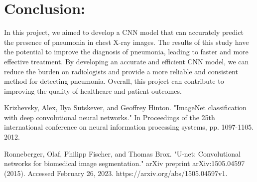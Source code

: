 \documentclass[11pt,a4paper]{article}
\begin{document}
\section*{Conclusion: }\noindent  In this project, we aimed to develop a CNN model that can accurately predict the presence of pneumonia in chest X-ray images. The results of this study have the potential to improve the diagnosis of pneumonia, leading to faster and more effective treatment. By developing an accurate and efficient CNN model, we can reduce the burden on radiologists and provide a more reliable and consistent method for detecting pneumonia. Overall, this project can contribute to improving the quality of healthcare and patient outcomes.


\begin{thebibliography}{9}

Krizhevsky, Alex, Ilya Sutskever, and Geoffrey Hinton. "ImageNet classification with deep convolutional neural networks." In Proceedings of the 25th international conference on neural information processing systems, pp. 1097-1105. 2012.

Ronneberger, Olaf, Philipp Fischer, and Thomas Brox. "U-net: Convolutional networks for biomedical image segmentation." arXiv preprint arXiv:1505.04597 (2015). Accessed February 26, 2023. https://arxiv.org/abs/1505.04597v1.

\end{thebibliography}
\end{document}
